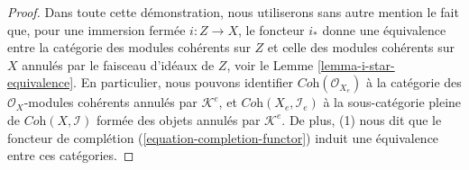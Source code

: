 \begin{proof}
Dans toute cette démonstration, nous utiliserons sans autre mention le fait que,
pour une immersion fermée $i : Z \to X$, le foncteur $i_*$ donne une
équivalence entre la catégorie des modules cohérents sur $Z$ et celle des
modules cohérents sur $X$ annulés par le faisceau d'idéaux de $Z$, voir le
Lemme \ref{lemma-i-star-equivalence}. En particulier, nous pouvons identifier
$\textit{Coh}(\mathcal{O}_{X_e})$ à la catégorie des
$\mathcal{O}_X$-modules cohérents annulés par $\mathcal{K}^e$, et
$\textit{Coh}(X_e, \mathcal{I}_e)$ à la sous-catégorie pleine de
$\textit{Coh}(X, \mathcal{I})$ formée des objets annulés par $\mathcal{K}^e$.
De plus, (1) nous dit que le foncteur de complétion
(\ref{equation-completion-functor}) induit une équivalence entre ces catégories.


\end{proof}
